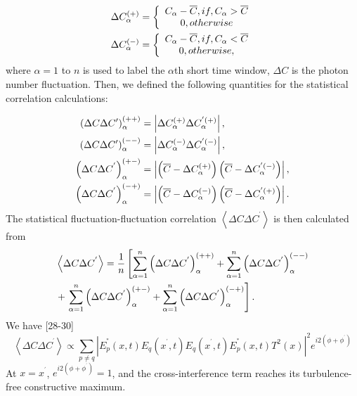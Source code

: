\documentclass[letterpaper,10pt]{article}
\begin{document}
\begin{align}
\Delta C_{\alpha }^{(+)}& =\left\{
\begin{array}{c}
C_{\alpha }-\overline{C},if,C_{\alpha }>\overline{C} \\
0,otherwise%
\end{array}%
\right.   \notag \\
\Delta C_{\alpha }^{(-)}& =\left\{
\begin{array}{c}
C_{\alpha }-\overline{C},if,C_{\alpha }<\overline{C} \\
0,otherwise,%
\end{array}%
\right.
\end{align}%
where $\alpha =1$ to $n$ is used to label the $\alpha $th short time
window, $\Delta C$ is the photon number fluctuation. Then, we defined the following quantities for the statistical
correlation calculations:

\begin{align}
\left( \Delta C\Delta C^{\prime }\right) _{\alpha }^{\left( ++\right) }&
=\left\vert \Delta C_{\alpha }^{(+)}\Delta C_{\alpha }^{^{\prime
}(+)}\right\vert ,  \notag \\
\left( \Delta C\Delta C^{\prime }\right) _{\alpha }^{\left( --\right) }&
=\left\vert \Delta C_{\alpha }^{(-)}\Delta C_{\alpha }^{^{\prime
}(-)}\right\vert ,  \notag \\
\left( \Delta C\Delta C^{^{\prime }}\right) _{\alpha }^{\left( +-\right) }&
=\left\vert \left( \overline{C}-\Delta C_{\alpha }^{(+)}\right) \left(
\overline{C}-\Delta C_{\alpha }^{^{\prime }(-)}\right) \right\vert ,  \notag
\\
\left( \Delta C\Delta C^{^{\prime }}\right) _{\alpha }^{\left( -+\right) }&
=\left\vert \left( \overline{C}-\Delta C_{\alpha }^{(-)}\right) \left(
\overline{C}-\Delta C_{\alpha }^{^{\prime }(+)}\right) \right\vert .
\end{align}%
The statistical fluctuation-fluctuation correlation $\left\langle \Delta
C\Delta C^{^{\prime }}\right\rangle $ is then calculated from%
\begin{align}
& \left\langle \Delta C\Delta C^{^{\prime }}\right\rangle =\frac{1}{n}\left[
\sum_{\alpha =1}^{n}\left( \Delta C\Delta C^{^{\prime }}\right) _{\alpha
}^{\left( ++\right) }+\sum_{\alpha =1}^{n}\left( \Delta C\Delta C^{^{\prime
}}\right) _{\alpha }^{\left( --\right) }\right.   \notag \\
& +\left. \sum_{\alpha =1}^{n}\left( \Delta C\Delta C^{^{\prime }}\right)
_{\alpha }^{\left( +-\right) }+\sum_{\alpha =1}^{n}\left( \Delta C\Delta
C^{^{\prime }}\right) _{\alpha }^{\left( -+\right) }\right] .
\end{align}%
We have [28-30]
\begin{equation}
\left\langle \Delta C\Delta C^{^{\prime }}\right\rangle \propto \sum_{p\neq
q}\left\vert E_{p}^{^{\ast }}\left( x,t\right) E_{q}\left( x^{^{\prime
}},t\right) E_{q}\left( x^{^{\prime }},t\right) E_{p}^{^{\ast }}\left(
x,t\right) T^{2}\left( x\right) \right\vert ^{2}e^{i2\left( \phi +\phi
^{^{\prime }}\right) }
\end{equation}%
At $x=x^{^{\prime }}$, $e^{i2\left( \phi +\phi ^{^{\prime }}\right) }=1$,
and the cross-interference term reaches its turbulence-free constructive
maximum.
\end{document}
